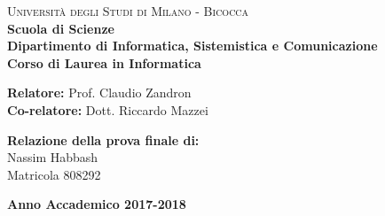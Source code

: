 
\begin{titlepage}
    
    \noindent
    \begin{minipage}[t]{0.18\textwidth}
    \end{minipage}
    \begin{minipage}[t]{0.8\textwidth}
    {
            {
            \textsc{Università degli Studi di Milano - Bicocca}} \\
            \textbf{Scuola di Scienze} \\
            \textbf{Dipartimento di Informatica, Sistemistica e Comunicazione} \\
            \textbf{Corso di Laurea in Informatica} \\
            \par
    }
    \end{minipage}
    
\vspace{40mm}
    
\begin{center}
        {\LARGE{
                \textbf{}
                \par
        }}
    \end{center}
    
    \vspace{50mm}

    \noindent
    {\large \textbf{Relatore:} Prof. Claudio Zandron } \\

    \noindent
    {\large \textbf{Co-relatore:} Dott. Riccardo Mazzei}
    
    \vspace{15mm}

    \begin{flushright}
        {\large \textbf{Relazione della prova finale di:}} \\
        \large{Nassim Habbash} \\
        \large{Matricola 808292} 
    \end{flushright}
    
    \vspace{30mm}
    \begin{center}
        {\large{\bf Anno Accademico 2017-2018}}
    \end{center}

    \restoregeometry
    
\end{titlepage}